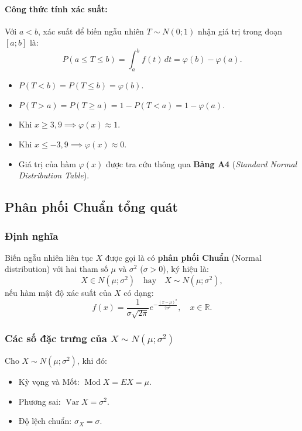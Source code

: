 \paragraph{Công thức tính xác suất:}
Với $a < b$, xác suất để biến ngẫu nhiên $T \sim N(0; 1)$ nhận giá trị trong đoạn $[a; b]$ là:
\[
P(a \le T \le b) = \int_a^b f(t)\,dt = \varphi(b) - \varphi(a).
\]

\begin{chuy}
\begin{itemize}
    \item $P(T < b) = P(T \le b) = \varphi(b)$.
    \item $P(T > a) = P(T \ge a) = 1 - P(T < a) = 1 - \varphi(a)$.
    \item Khi $x \ge 3{,}9 \implies \varphi(x) \approx 1$.
    \item Khi $x \le -3{,}9 \implies \varphi(x) \approx 0$.
    \item Giá trị của hàm $\varphi(x)$ được tra cứu thông qua \textbf{Bảng A4} (\textit{Standard Normal Distribution Table}).
\end{itemize}
\end{chuy}

\subsection{Phân phối Chuẩn tổng quát}

\subsubsection{Định nghĩa}

\begin{dinhnghia}
Biến ngẫu nhiên liên tục $X$ được gọi là có \textbf{phân phối Chuẩn} (Normal distribution) với hai tham số $\mu$ và $\sigma^2$ ($\sigma > 0$), ký hiệu là:
\[
X \in N(\mu; \sigma^2) \quad \text{hay} \quad X \sim N(\mu; \sigma^2),
\]
nếu hàm mật độ xác suất của $X$ có dạng:
\[
f(x) = \frac{1}{\sigma\sqrt{2\pi}} e^{-\frac{(x - \mu)^2}{2\sigma^2}}, \quad x \in \mathbb{R}.
\]
\end{dinhnghia}

\subsubsection{Các số đặc trưng của \texorpdfstring{$X \sim N(\mu; \sigma^2)$}{X ~ N(mu; sigma2)}}

\begin{tinhchat}
Cho $X \sim N(\mu; \sigma^2)$, khi đó:
\begin{itemize}
    \item Kỳ vọng và Mốt: $\operatorname{Mod} X = EX = \mu$.
    \item Phương sai: $\operatorname{Var} X = \sigma^2$.
    \item Độ lệch chuẩn: $\sigma_X = \sigma$.
\end{itemize}
\end{tinhchat}

